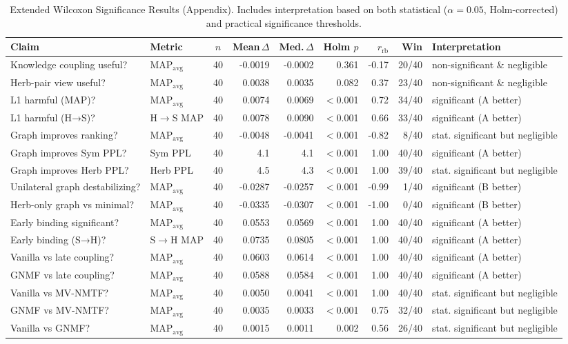 \begin{table}[t]
\centering
\caption{Extended Wilcoxon Significance Results (Appendix). Includes interpretation based on both statistical ($\alpha{=}0.05$, Holm-corrected) and practical significance thresholds.}
\label{tab:wilcoxon_appendix}
\footnotesize
\begin{tabular}{llcrrrrrl}
\toprule
Claim & Metric & $n$ & Mean\,$\Delta$ & Med.\,$\Delta$ & Holm $p$ & $r_{\text{rb}}$ & Win & Interpretation \\
\midrule
Knowledge coupling useful? & MAP$_{\text{avg}}$ & 40 & -0.0019 & -0.0002 & 0.361 & -0.17 & 20/40 & non-significant \& negligible \\
Herb-pair view useful? & MAP$_{\text{avg}}$ & 40 & 0.0038 & 0.0035 & 0.082 & 0.37 & 23/40 & non-significant \& negligible \\
L1 harmful (MAP)? & MAP$_{\text{avg}}$ & 40 & 0.0074 & 0.0069 & $<$0.001 & 0.72 & 34/40 & significant (A better) \\
L1 harmful (H→S)? & H$\to$S MAP & 40 & 0.0078 & 0.0090 & $<$0.001 & 0.66 & 33/40 & significant (A better) \\
Graph improves ranking? & MAP$_{\text{avg}}$ & 40 & -0.0048 & -0.0041 & $<$0.001 & -0.82 & 8/40 & stat. significant but negligible \\
Graph improves Sym PPL? & Sym PPL & 40 & 4.1 & 4.1 & $<$0.001 & 1.00 & 40/40 & significant (A better) \\
Graph improves Herb PPL? & Herb PPL & 40 & 4.5 & 4.3 & $<$0.001 & 1.00 & 39/40 & stat. significant but negligible \\
Unilateral graph destabilizing? & MAP$_{\text{avg}}$ & 40 & -0.0287 & -0.0257 & $<$0.001 & -0.99 & 1/40 & significant (B better) \\
Herb-only graph vs minimal? & MAP$_{\text{avg}}$ & 40 & -0.0335 & -0.0307 & $<$0.001 & -1.00 & 0/40 & significant (B better) \\
Early binding significant? & MAP$_{\text{avg}}$ & 40 & 0.0553 & 0.0569 & $<$0.001 & 1.00 & 40/40 & significant (A better) \\
Early binding (S→H)? & S$\to$H MAP & 40 & 0.0735 & 0.0805 & $<$0.001 & 1.00 & 40/40 & significant (A better) \\
Vanilla vs late coupling? & MAP$_{\text{avg}}$ & 40 & 0.0603 & 0.0614 & $<$0.001 & 1.00 & 40/40 & significant (A better) \\
GNMF vs late coupling? & MAP$_{\text{avg}}$ & 40 & 0.0588 & 0.0584 & $<$0.001 & 1.00 & 40/40 & significant (A better) \\
Vanilla vs MV-NMTF? & MAP$_{\text{avg}}$ & 40 & 0.0050 & 0.0041 & $<$0.001 & 1.00 & 40/40 & stat. significant but negligible \\
GNMF vs MV-NMTF? & MAP$_{\text{avg}}$ & 40 & 0.0035 & 0.0033 & $<$0.001 & 0.75 & 32/40 & stat. significant but negligible \\
Vanilla vs GNMF? & MAP$_{\text{avg}}$ & 40 & 0.0015 & 0.0011 & 0.002 & 0.56 & 26/40 & stat. significant but negligible \\
\bottomrule
\end{tabular}
\end{table}